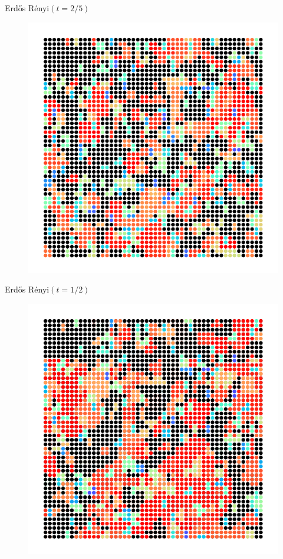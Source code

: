 \documentclass{beamer}
\newcommand{\ER}{Erd\H{o}s R\'enyi\xspace}
\begin{document}
\begin{frame}{\ER $(t=2/5)$}
	\begin{figure}[H]
		\centering
		\includegraphics[scale=0.7]{fig/precrit.pdf}
	\end{figure}
\end{frame}
\begin{frame}{\ER $(t=1/2)$}
        \begin{figure}[H]
                \centering
                \includegraphics[scale=0.7]{fig/crit.pdf}
        \end{figure}
\end{frame}
\end{document}
